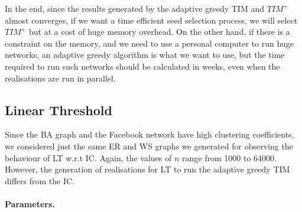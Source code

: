 



In the end, since the results generated by the adaptive greedy TIM and $TIM^+$ almost converges, if we want a time efficient seed selection process, we will select $TIM^+$ but at a cost of huge memory overhead. On the other hand, if there is a constraint on the memory, and we need to use a personal computer to run huge networks, an adaptive greedy algorithm is what we want to use, but the time required to run such networks should be calculated in weeks, even when the realisations are run in parallel. 









\subsection{Linear Threshold}

Since the BA graph and the Facebook network have high clustering coefficients, we considered just the same ER and WS graphs we generated for observing the behaviour of LT w.r.t IC. Again, the values of $n$ range from 1000 to 64000. However, the generation of realisations for LT to run the adaptive greedy TIM differs from the IC. 

\paragraph{Parameters.}

